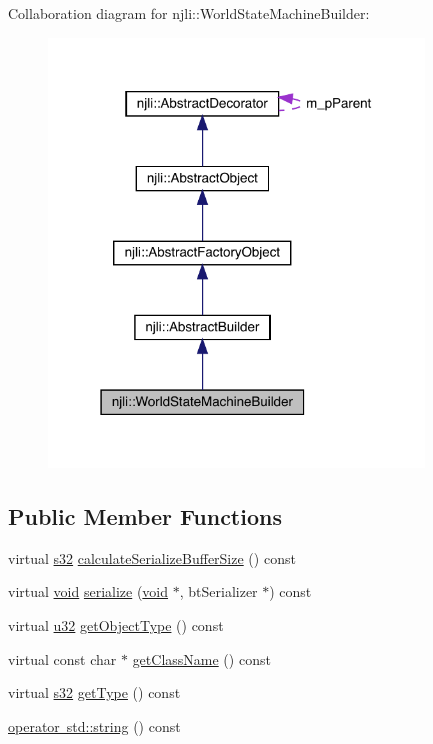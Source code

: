 Collaboration diagram for njli\+:\+:World\+State\+Machine\+Builder\+:\nopagebreak
\begin{figure}[H]
\begin{center}
\leavevmode
\includegraphics[width=283pt]{classnjli_1_1_world_state_machine_builder__coll__graph}
\end{center}
\end{figure}
\subsection*{Public Member Functions}
\begin{DoxyCompactItemize}
\item 
virtual \mbox{\hyperlink{_util_8h_aa62c75d314a0d1f37f79c4b73b2292e2}{s32}} \mbox{\hyperlink{classnjli_1_1_world_state_machine_builder_aa86c5d3ef13e1cfc652b69ef927ce1e6}{calculate\+Serialize\+Buffer\+Size}} () const
\item 
virtual \mbox{\hyperlink{_thread_8h_af1e856da2e658414cb2456cb6f7ebc66}{void}} \mbox{\hyperlink{classnjli_1_1_world_state_machine_builder_a46fce2e29eb63256187533c4abb4bb53}{serialize}} (\mbox{\hyperlink{_thread_8h_af1e856da2e658414cb2456cb6f7ebc66}{void}} $\ast$, bt\+Serializer $\ast$) const
\item 
virtual \mbox{\hyperlink{_util_8h_a10e94b422ef0c20dcdec20d31a1f5049}{u32}} \mbox{\hyperlink{classnjli_1_1_world_state_machine_builder_adc1828ed4b64977e2c892fa1559e5f3d}{get\+Object\+Type}} () const
\item 
virtual const char $\ast$ \mbox{\hyperlink{classnjli_1_1_world_state_machine_builder_a23c20795eb84296c30fc813cb901f8e4}{get\+Class\+Name}} () const
\item 
virtual \mbox{\hyperlink{_util_8h_aa62c75d314a0d1f37f79c4b73b2292e2}{s32}} \mbox{\hyperlink{classnjli_1_1_world_state_machine_builder_a6e030fedf2c31bc287545aacc226dce8}{get\+Type}} () const
\item 
\mbox{\hyperlink{classnjli_1_1_world_state_machine_builder_a276290caadbb9b04f1e27665a19c9e69}{operator std\+::string}} () const
\end{DoxyCompactItemize}
